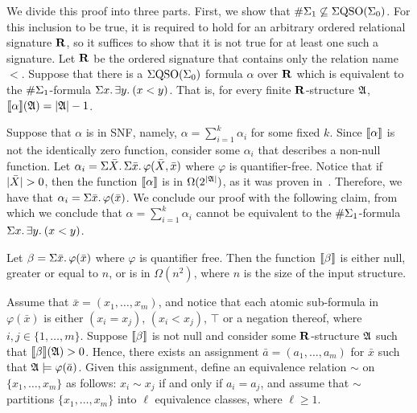 
We divide this proof into three parts.
First, we show that $\#\Sigma_{1} \not\subseteq \Sigma{\rm QSO}(\Sigma_{0})$. 
For this inclusion to be true, it is required to hold for an arbitrary ordered relational signature $\mathbf{R}$, so it suffices to show that it  is not true for at least one such a signature.
Let $\mathbf{R}$ be the ordered signature that contains only the relation name $<$.
Suppose that there is a $\Sigma{\rm QSO}(\Sigma_{0})$ formula $\alpha$ over $\mathbf{R}$ which is equivalent to the $\#\Sigma_{1}$-formula $\Sigma{x}.\, \exists{y}.\: (x < y)$. 
That is, for every finite $\mathbf{R}$-structure $\mathfrak{A}$, ${\llbracket{}{\alpha}\rrbracket}(\mathfrak{A}) = \vert \mathfrak{A} \vert - 1$.

Suppose that $\alpha$ is in SNF, namely, $\alpha = \sum_{i = 1}^k \alpha_i$ for some fixed $k$. 
Since ${\llbracket{}{\alpha}\rrbracket}$ is not the identically zero function, consider some $\alpha_i$ that describes a non-null function. 
Let $\alpha_i = \Sigma{\bar{X}}.\,\Sigma{\bar{x}}.\,\varphi(\bar{X},\bar{x})$ where $\varphi$ is quantifier-free. 
Notice that if $\vert \bar{X} \vert > 0$, then the function ${\llbracket{}{\alpha}\rrbracket}$ is in $\Omega(2^{\vert \mathfrak{A} \vert})$, as it was proven in~\cite{SalujaST95}. 
Therefore, we have that $\alpha_i = \Sigma{\bar{x}}.\,\varphi(\bar{x})$. 
We conclude our proof with the following claim, from which we conclude that $\alpha = \sum_{i = 1}^k \alpha_i$ cannot be equivalent to the $\#\Sigma_{1}$-formula $\Sigma{x}.\, \exists{y}.\: (x < y)$. 
\begin{clm}
	Let $\beta = \Sigma{\bar{x}}.\,\varphi(\bar{x})$	where $\varphi$ is quantifier free. 
	Then the function ${\llbracket{}{\beta}\rrbracket}$ is either null, greater or equal to $n$, or is in $\Omega(n^2)$, where $n$ is the size of the input structure.
\end{clm}
\proof
Assume that $\bar x = (x_1, \ldots, x_m)$, and notice that each atomic sub-formula in $\varphi(\bar{x})$ is either $(x_i = x_j)$, $(x_i < x_j)$, $\top$ or a negation thereof, where $i,j \in \{1, \ldots, m\}$. 
	Suppose ${\llbracket{}{\beta}\rrbracket}$ is not null and consider some $\mathbf{R}$-structure $\mathfrak{A}$ such that ${\llbracket{}{\beta}\rrbracket}(\mathfrak{A}) > 0$. Hence, there exists an assignment $\bar a = (a_1, \ldots, a_m)$
	for $\bar{x}$ such that $\mathfrak{A}\models\varphi(\bar{a})$.
	Given this assignment, define an equivalence relation $\sim$ on $\{x_1, \ldots, x_m\}$ as follows: $x_i \sim x_j$ if and only if $a_i = a_j$, and assume that $\sim$ partitions $\{x_1, \ldots, x_m\}$ into $\ell$ equivalence classes, where $\ell \geq 1$.
